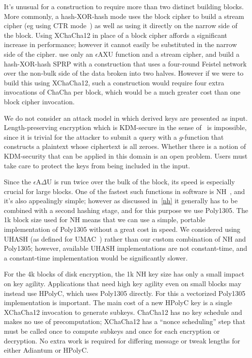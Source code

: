 \documentclass[journal=tosc,preprint,floatrow,submission]{iacrtrans}
\begin{document}
It's unusual for a construction to require more than two distinct building blocks.
More commonly, a hash-XOR-hash mode uses the block cipher to build a stream cipher
(eg using CTR mode~\cite{ctr})
as well as using it directly on the narrow side of the block.
Using XChaCha12 in place of a block cipher affords a significant increase in performance;
however it cannot easily be substituted in the narrow side of the cipher.
\cite{sarkar1,sarkar2,sarkar3,sarkar4} use only an $\epsilon$AXU function
and a stream cipher, and build a hash-XOR-hash SPRP
with a construction that uses a four-round Feistel network over the non-bulk side of the data
broken into two halves. However if we were to build this using XChaCha12,
such a construction would require four extra invocations of ChaCha per block, which would be
a much greater cost than one block cipher invocation.

We do not consider an attack model in which derived keys are presented as input.
Length-preserving encryption
which is KDM-secure in the sense of~\cite{kdm} is impossible, since it is trivial for the
attacker to submit a query with a $g$-function
that constructs a plaintext whose ciphertext is all zeroes.
Whether there is a notion of KDM-security that can be
applied in this domain is an open problem. Users must take care to protect the keys from being
included in the input.

Since the $\epsilon$A$\Delta$U is run twice over the bulk of the block, its speed is especially
crucial for large blocks. One of the fastest such functions in software is NH~\cite{nh}, and
it's also appealingly simple; however as discussed in~\autoref{nh} it generally has to be
combined with a second hashing stage, and for this purpose we use Poly1305. The 1k block size
used for NH means that we can use a simple, portable implementation of Poly1305 without a great
cost in speed.  We considered using UHASH (as defined for UMAC~\cite{rfc4418}) rather than our
custom combination of NH and Poly1305; however, available UHASH implementations
are not constant-time, and a constant-time implementation would be significantly
slower.

For the 4k blocks of disk encryption,
the 1k NH key size has only a small impact on key agility. Applications
that need high key agility even on small blocks may instead use HPolyC, which
uses Poly1305 directly. For this a vectorized Poly1305 implementation is important.  The main
cost of a new HPolyC key is a single XChaCha12 invocation to generate subkeys.
ChaCha12 has no key schedule
and makes no use of precomputation; XChaCha12 has a ``nonce scheduling'' step
that must be called once to compute subkeys and once for each encryption or
decryption.  No extra work is required for differing message or tweak lengths for either Adiantum
or HPolyC.
\end{document}

